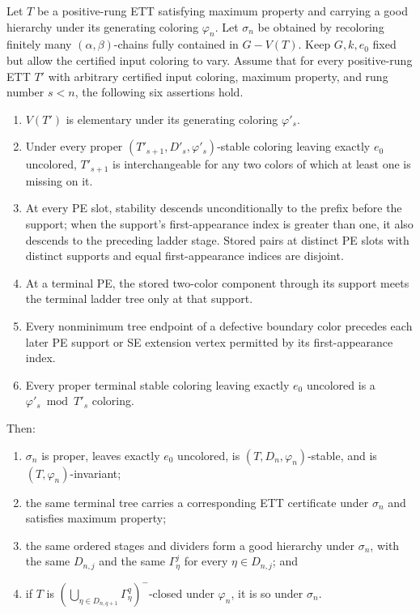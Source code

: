 \begin{lemma}
Let $T$ be a positive-rung ETT satisfying maximum property and carrying a
good hierarchy under its generating coloring $\varphi_n$.  Let
$\sigma_n$ be obtained by recoloring finitely many
$(\alpha,\beta)$-chains fully contained in $G-V(T)$.  Keep $G,k,e_0$
fixed but allow the certified input coloring to vary.  Assume that for
every positive-rung ETT $T'$ with arbitrary certified input coloring,
maximum property, and rung number $s<n$, the following six assertions
hold.
\begin{enumerate}
\item $V(T')$ is elementary under its generating coloring
$\varphi'_s$.
\item Under every proper $(T'_{s+1},D'_s,\varphi'_s)$-stable coloring
leaving exactly $e_0$ uncolored, $T'_{s+1}$ is interchangeable for any
two colors of which at least one is missing on it.
\item At every PE slot, stability descends unconditionally to the prefix before the
support; when the support's first-appearance index is greater than one, it
also descends to the preceding ladder stage.  Stored pairs at distinct PE slots with distinct supports
and equal first-appearance indices are disjoint.
\item At a terminal PE, the stored two-color component through its
support meets the terminal ladder tree only at that support.
\item Every nonminimum tree endpoint of a defective boundary color
precedes each later PE support or SE extension vertex permitted by its
first-appearance index.
\item Every proper terminal stable coloring leaving exactly $e_0$
uncolored is a $\varphi'_s\bmod T'_s$ coloring.
\end{enumerate}
Then:
\begin{enumerate}
\item $\sigma_n$ is proper, leaves exactly $e_0$ uncolored, is
$(T,D_n,\varphi_n)$-stable, and is $(T,\varphi_n)$-invariant;
\item the same terminal tree carries a corresponding ETT certificate
under $\sigma_n$ and satisfies maximum property;
\item the same ordered stages and dividers form a good hierarchy under
$\sigma_n$, with the same $D_{n,j}$ and the same $\Gamma^j_\eta$ for
every $\eta\in D_{n,j}$; and
\item if $T$ is
$(\bigcup_{\eta\in D_{n,q+1}}\Gamma^q_\eta)^{-}$-closed under
$\varphi_n$, it is so under $\sigma_n$.
\end{enumerate}
\end{lemma}
